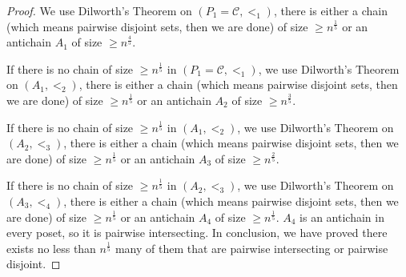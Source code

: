 \documentclass{article}
\theoremstyle{definition}
\begin{document}
\begin{proof}
    We use Dilworth's Theorem on $(P_1=\mathcal{C},<_1)$, there is either a chain (which means pairwise disjoint sets, then we are done) of size $\geq n^\frac{1}{5}$ or an antichain $A_1$ of size $\geq n^\frac{4}{5}$.
    
    If there is no chain of size $\geq n^\frac{1}{5}$ in $(P_1=\mathcal{C},<_1)$, we use Dilworth's Theorem on $(A_1,<_2)$, there is either a chain (which means pairwise disjoint sets, then we are done) of size $\geq n^\frac{1}{5}$ or an antichain $A_2$ of size $\geq n^\frac{3}{5}$.

    If there is no chain of size $\geq n^\frac{1}{5}$ in $(A_1,<_2)$, we use Dilworth's Theorem on $(A_2,<_3)$, there is either a chain (which means pairwise disjoint sets, then we are done) of size $\geq n^\frac{1}{5}$ or an antichain $A_3$ of size $\geq n^\frac{2}{5}$.

    If there is no chain of size $\geq n^\frac{1}{5}$ in $(A_2,<_3)$, we use Dilworth's Theorem on $(A_3,<_4)$, there is either a chain (which means pairwise disjoint sets, then we are done) of size $\geq n^\frac{1}{5}$ or an antichain $A_4$ of size $\geq n^\frac{1}{5}$. $A_4$ is an antichain in every poset, so it is pairwise intersecting. In conclusion, we have proved there exists no less than $n^\frac{1}{5}$ many of them that are pairwise intersecting or pairwise disjoint.


\end{proof}
\end{document}
